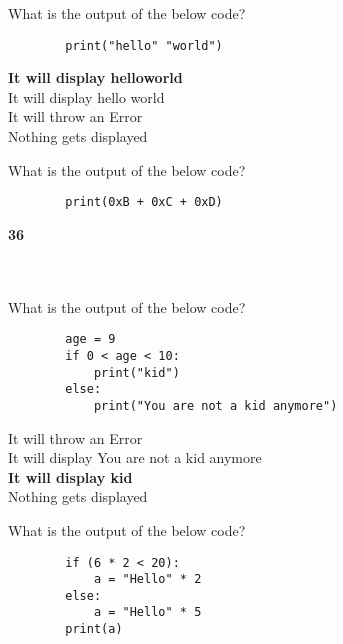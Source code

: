\documentclass{exam}
\begin{document}
\begin{questions}
      \question What is the output of the below code?

      \begin{verbatim}
        print("hello" "world")
      \end{verbatim}

      \begin{oneparchoices}
          \choice \textbf{It will display helloworld} \\
          \choice It will display hello world \\
          \choice It will throw an Error \\
          \choice Nothing gets displayed 
      \end{oneparchoices}

      \question What is the output of the below code?

      \begin{verbatim}
        print(0xB + 0xC + 0xD)
      \end{verbatim}

      \begin{oneparchoices}
          \choice \textbf{36} \\
           \\
           \\
      \end{oneparchoices}


      \question What is the output of the below code?

      \begin{verbatim}
        age = 9
        if 0 < age < 10:
            print("kid")
        else:
            print("You are not a kid anymore")
      \end{verbatim}

      \begin{oneparchoices}
          \choice It will throw an Error \\
          \choice It will display You are not a kid anymore \\
          \choice \textbf{It will display kid} \\
          \choice Nothing gets displayed
      \end{oneparchoices}

      \question What is the output of the below code?

      \begin{verbatim}
        if (6 * 2 < 20):
            a = "Hello" * 2
        else:
            a = "Hello" * 5
        print(a)
      \end{verbatim}


\end{questions}
\end{document}
